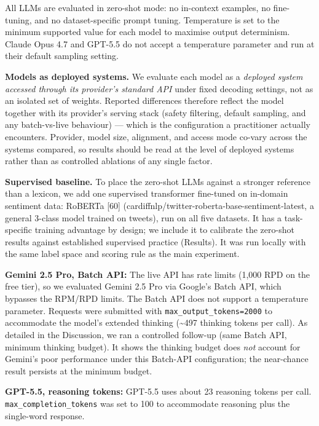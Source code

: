 \documentclass[11pt]{article}
\begin{document}
All LLMs are evaluated in zero-shot mode: no in-context examples, no
fine-tuning, and no dataset-specific prompt tuning. Temperature is set
to the minimum supported value for each model to maximise output
determinism. Claude Opus 4.7 and GPT-5.5 do not accept a temperature
parameter and run at their default sampling setting.

\textbf{Models as deployed systems.} We evaluate each model as a
\emph{deployed system accessed through its provider's standard API}
under fixed decoding settings, not as an isolated set of weights.
Reported differences therefore reflect the model together with its
provider's serving stack (safety filtering, default sampling, and any
batch-vs-live behaviour) --- which is the configuration a practitioner
actually encounters. Provider, model size, alignment, and access mode
co-vary across the systems compared, so results should be read at the
level of deployed systems rather than as controlled ablations of any
single factor.

\textbf{Supervised baseline.} To place the zero-shot LLMs against a
stronger reference than a lexicon, we add one supervised transformer
fine-tuned on in-domain sentiment data: RoBERTa {[}60{]}
(cardiffnlp/twitter-roberta-base-sentiment-latest, a general 3-class
model trained on tweets), run on all five datasets. It has a
task-specific training advantage by design; we include it to calibrate
the zero-shot results against established supervised practice (Results).
It was run locally with the same label space and scoring rule as the
main experiment.

\textbf{Gemini 2.5 Pro, Batch API:} The live API has rate limits (1,000
RPD on the free tier), so we evaluated Gemini 2.5 Pro via Google's Batch
API, which bypasses the RPM/RPD limits. The Batch API does not support a
temperature parameter. Requests were submitted with
\texttt{max\_\allowbreak{}output\_\allowbreak{}tokens=2000} to accommodate the model's extended
thinking (\textasciitilde497 thinking tokens per call). As detailed in
the Discussion, we ran a controlled follow-up (same Batch API, minimum
thinking budget). It shows the thinking budget does \emph{not} account
for Gemini's poor performance under this Batch-API configuration; the
near-chance result persists at the minimum budget.

\textbf{GPT-5.5, reasoning tokens:} GPT-5.5 uses about 23 reasoning
tokens per call. \texttt{max\_\allowbreak{}completion\_\allowbreak{}tokens} was set to 100 to
accommodate reasoning plus the single-word response.
\end{document}
